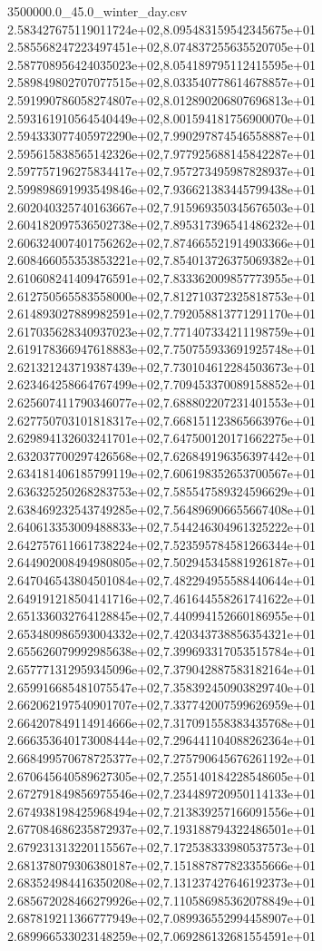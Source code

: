 \begin{filecontents*}{3500000.0_45.0_winter_day.csv}
2.583427675119011724e+02,8.095483159542345675e+01
2.585568247223497451e+02,8.074837255635520705e+01
2.587708956424035023e+02,8.054189795112415595e+01
2.589849802707077515e+02,8.033540778614678857e+01
2.591990786058274807e+02,8.012890206807696813e+01
2.593161910564540449e+02,8.001594181756900070e+01
2.594333077405972290e+02,7.990297874546558887e+01
2.595615838565142326e+02,7.977925688145842287e+01
2.597757196275834417e+02,7.957273495987828937e+01
2.599898691993549846e+02,7.936621383445799438e+01
2.602040325740163667e+02,7.915969350345676503e+01
2.604182097536502738e+02,7.895317396541486232e+01
2.606324007401756262e+02,7.874665521914903366e+01
2.608466055353853221e+02,7.854013726375069382e+01
2.610608241409476591e+02,7.833362009857773955e+01
2.612750565583558000e+02,7.812710372325818753e+01
2.614893027889982591e+02,7.792058813771291170e+01
2.617035628340937023e+02,7.771407334211198759e+01
2.619178366947618883e+02,7.750755933691925748e+01
2.621321243719387439e+02,7.730104612284503673e+01
2.623464258664767499e+02,7.709453370089158852e+01
2.625607411790346077e+02,7.688802207231401553e+01
2.627750703101818317e+02,7.668151123865663976e+01
2.629894132603241701e+02,7.647500120171662275e+01
2.632037700297426568e+02,7.626849196356397442e+01
2.634181406185799119e+02,7.606198352653700567e+01
2.636325250268283753e+02,7.585547589324596629e+01
2.638469232543749285e+02,7.564896906655667408e+01
2.640613353009488833e+02,7.544246304961325222e+01
2.642757611661738224e+02,7.523595784581266344e+01
2.644902008494980805e+02,7.502945345881926187e+01
2.647046543804501084e+02,7.482294955588440644e+01
2.649191218504141716e+02,7.461644558261741622e+01
2.651336032764128845e+02,7.440994152660186955e+01
2.653480986593004332e+02,7.420343738856354321e+01
2.655626079992985638e+02,7.399693317053515784e+01
2.657771312959345096e+02,7.379042887583182164e+01
2.659916685481075547e+02,7.358392450903829740e+01
2.662062197540901707e+02,7.337742007599626959e+01
2.664207849114914666e+02,7.317091558383435768e+01
2.666353640173008444e+02,7.296441104088262364e+01
2.668499570678725377e+02,7.275790645676261192e+01
2.670645640589627305e+02,7.255140184228548605e+01
2.672791849856975546e+02,7.234489720950114133e+01
2.674938198425968494e+02,7.213839257166091556e+01
2.677084686235872937e+02,7.193188794322486501e+01
2.679231313220115567e+02,7.172538333980537573e+01
2.681378079306380187e+02,7.151887877823355666e+01
2.683524984416350208e+02,7.131237427646192373e+01
2.685672028466279926e+02,7.110586985362078849e+01
2.687819211366777949e+02,7.089936552994458907e+01
2.689966533023148259e+02,7.069286132681554591e+01

\end{filecontents*}
